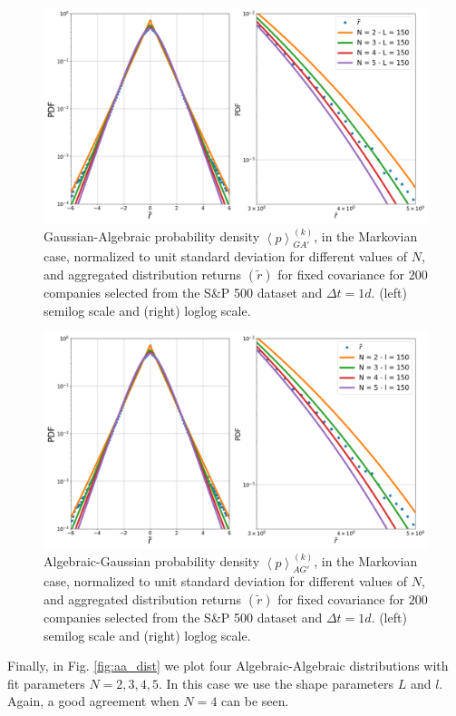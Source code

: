 \begin{figure}[htbp]
    \centering
    \includegraphics[width=0.7\columnwidth]
    {figures/08_ga.png}
    \caption{Gaussian-Algebraic probability density
             $\left\langle p \right\rangle_{GA'}^{\left(k\right)}$, in the
             Markovian case, normalized to unit standard deviation for
             different values of $N$, and aggregated distribution returns
             $\left(\tilde{r}\right)$ for fixed covariance for $200$ companies
             selected from the S\&P 500 dataset and $\Delta t = 1d$. (left)
             semilog scale and (right) loglog scale.}
    \label{fig:ga_dist}
\end{figure}

\begin{figure}[htbp]
    \centering
    \includegraphics[width=0.7\columnwidth]
    {figures/08_ag.png}
    \caption{Algebraic-Gaussian probability density
             $\left\langle p \right\rangle_{AG'}^{\left(k\right)}$, in the
             Markovian case, normalized to unit standard deviation for
             different values of $N$, and aggregated distribution returns
             $\left(\tilde{r}\right)$ for fixed covariance for $200$ companies
             selected from the S\&P 500 dataset and $\Delta t = 1d$. (left)
             semilog scale and (right) loglog scale.}
    \label{fig:ag_dist}
\end{figure}

Finally, in Fig. \ref{fig:aa_dist} we plot four Algebraic-Algebraic
distributions with fit parameters $N = 2, 3, 4, 5$. In this case we use the
shape parameters $L$ and $l$. Again, a good agreement when $N = 4$ can be seen.


